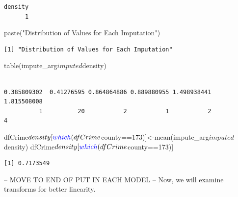 \documentclass[]{article}
\newenvironment{Shaded}{}{}
\newcommand{\DecValTok}[1]{#1}
\newcommand{\KeywordTok}[1]{\textcolor[rgb]{0.00,0.00,1.00}{#1}}
\newcommand{\NormalTok}[1]{#1}
\newcommand{\OperatorTok}[1]{#1}
\newcommand{\StringTok}[1]{\textcolor[rgb]{0.00,0.50,0.50}{#1}}
\begin{document}
\begin{verbatim}
density 
      1 
\end{verbatim}

\begin{Shaded}
\begin{Highlighting}[]
\KeywordTok{paste}\NormalTok{(}\StringTok{"Distribution of Values for Each Imputation"}\NormalTok{)}
\end{Highlighting}
\end{Shaded}

\begin{verbatim}
[1] "Distribution of Values for Each Imputation"
\end{verbatim}

\begin{Shaded}
\begin{Highlighting}[]
\KeywordTok{table}\NormalTok{(impute_arg}\OperatorTok{$}\NormalTok{imputed}\OperatorTok{$}\NormalTok{density)}
\end{Highlighting}
\end{Shaded}

\begin{verbatim}

0.385809302  0.41276595 0.864864886 0.889880955 1.498938441 1.815508008 
          1          20           2           1           2           4 
\end{verbatim}

\begin{Shaded}
\begin{Highlighting}[]
\NormalTok{dfCrime}\OperatorTok{$}\NormalTok{density[}\KeywordTok{which}\NormalTok{(dfCrime}\OperatorTok{$}\NormalTok{county}\OperatorTok{==}\DecValTok{173}\NormalTok{)]<-}\KeywordTok{mean}\NormalTok{(impute_arg}\OperatorTok{$}\NormalTok{imputed}\OperatorTok{$}\NormalTok{density)}
\NormalTok{dfCrime}\OperatorTok{$}\NormalTok{density[}\KeywordTok{which}\NormalTok{(dfCrime}\OperatorTok{$}\NormalTok{county}\OperatorTok{==}\DecValTok{173}\NormalTok{)]}
\end{Highlighting}
\end{Shaded}

\begin{verbatim}
[1] 0.7173549
\end{verbatim}

-- MOVE TO END OF PUT IN EACH MODEL -- Now, we will examine transforms
for better linearity.
\end{document}
